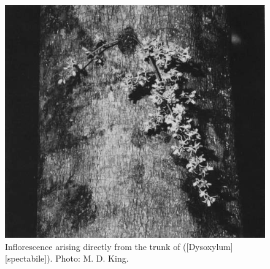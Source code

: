 \begin{figure}[t]
	\begin{minipage}[t]{\textwidth}
		\begin{minipage}[t]{(\textwidth-\fgap) * \real{0.628}}
			\centering
			\includegraphics[width=\textwidth]{graphics/fig_016}
			\caption[Inflorescence arising directly from the trunk of kohekohe]{Inflorescence arising directly from the trunk of  ([Dysoxylum][spectabile]).
			Photo:  M. D. King.}%
			\label{fig:16infloresence}
		\end{minipage}\hspace{\fgap}%
		\begin{minipage}[t]{(\textwidth-\fgap) * \real{0.372}}
			\centering

\end{minipage}
\end{minipage}
\end{figure}
